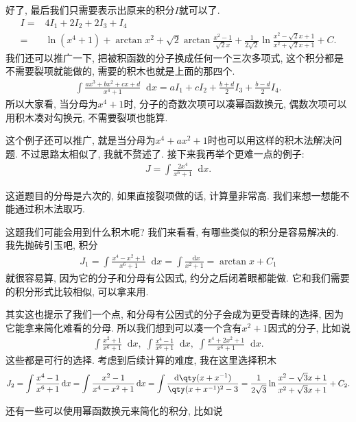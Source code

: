 \documentclass{ctexbook}
\newcommand*{\dif}{\mathop{}\!\mathrm{d}}
\begin{document}
{好了, 最后我们只需要表示出原来的积分$I$就可以了. 
\begin{align*}
I={}&4I_{1}+2I_{2}+2I_{3}+I_{4}\\
={}&\ln(x^{4}+1)+\arctan{x^{2}}+\sqrt{2}\arctan{\frac{x^{2}-1}{\sqrt{2}x}}+\frac{1}{2\sqrt{2}}\ln{\frac{x^{2}-\sqrt{2}x+1}{x^{2}+\sqrt{2}x+1}}+C
.\end{align*}
我们还可以推广一下, 把被积函数的分子换成任何一个三次多项式, 这个积分都是不需要裂项就能做的, 需要的积木也就是上面的那四个. 
\begin{align*}
\int\frac{ax^{3}+bx^{2}+cx+d}{x^{4}+1}\dif{x}=aI_{1}+cI_{2}+\frac{b+d}{2}I_{3}+\frac{b-d}{2}I_{4}
.\end{align*}
所以大家看, 当分母为$x^{4}+1$时, 分子的奇数次项可以凑幂函数换元, 偶数次项可以用积木凑对勾换元, 不需要裂项也能算. \par
这个例子还可以推广, 就是当分母为$x^{4}+ax^{2}+1$时也可以用这样的积木法解决问题. 不过思路太相似了, 我就不赘述了. 接下来我再举个更难一点的例子: 
\begin{align*}
J=\int\frac{2x^{4}}{x^{6}+1}\dif{x}
.\end{align*}\par
这道题目的分母是六次的, 如果直接裂项做的话, 计算量非常高. 我们来想一想能不能通过积木法取巧. \par
这题我们可能会用到什么积木呢? 我们来看看, 有哪些类似的积分是容易解决的. 我先抛砖引玉吧, 积分
\begin{align*}
J_{1}=\int\frac{x^{4}-x^{2}+1}{x^{6}+1}\dif{x}=\int\frac{\dif{x}}{x^{2}+1}=\arctan{x}+C_{1}
\end{align*}
就很容易算, 因为它的分子和分母有公因式, 约分之后闭着眼都能做. 它和我们需要的积分形式比较相似, 可以拿来用. \par
其实这也提示了我们一个点, 和分母有公因式的分子会成为更受青睐的选择, 因为它能拿来简化难看的分母. 所以我们想到可以凑一个含有$x^{2}+1$因式的分子, 比如说
\begin{align*}
\int\frac{x^{2}+1}{x^{6}+1}\dif{x},\;\int\frac{x^{4}-1}{x^{6}+1}\dif{x},\;\int\frac{x^{4}+2x^{2}+1}{x^{6}+1}\dif{x}
.\end{align*}
这些都是可行的选择. 考虑到后续计算的难度, 我在这里选择积木
\begin{align*}
J_{2}=\int\frac{x^{4}-1}{x^{6}+1}\dif{x}=\int\frac{x^{2}-1}{x^{4}-x^{2}+1}\dif{x}=\int\frac{\dif{\qty(x+x^{-1})}}{\qty(x+x^{-1})^{2}-3}=\frac{1}{2\sqrt{3}}\ln{\frac{x^{2}-\sqrt{3}x+1}{x^{2}+\sqrt{3}x+1}}+C_{2}
.\end{align*}\par
还有一些可以使用幂函数换元来简化的积分, 比如说
}
\end{document}
